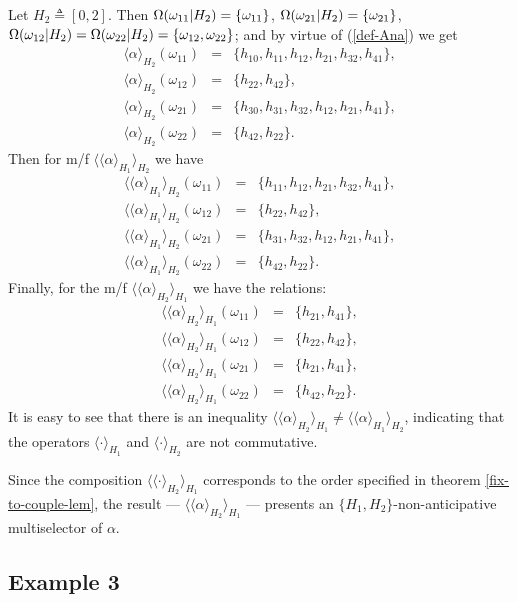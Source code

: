 \documentclass[sn-mathphys,Numbered,pdflatex]{sn-jnl}%
\theoremstyle{thmstyleone}%
\theoremstyle{thmstyletwo}%
\theoremstyle{thmstylethree}%
\newcommand{\mydef}{\mathrel{\triangleq}}%
\newcommand{\res}[2]{\ensuremath{(#1|#2)}}%
\newcommand{\naOm}{\ensuremath{\Omega}}%
\newcommand{\naOmo}[2]{\naOm\setbox0=\hbox{\text{$#1$}}\ifdim\wd0=0pt\else\res{#1}{#2}\fi}%
\newcommand{\Ana}[2]{\ensuremath{\langle{#1}\rangle_{#2}}}%
\newcommand{\fref}[1]{{\rm(\ref{#1})}}   %
\begin{document}
Let $H_2\mydef[0,2]$.
Then $\naOmo{\omega_{11}}{H_2}=\{\omega_{11}\}$, $\naOmo{\omega_{21}}{H_2}=\{\omega_{21}\}$, $\naOmo{\omega_{12}}{H_2}=\naOmo{\omega_{22}}{H_2}=\{\omega_{12},\omega_{22}\}$;
and by virtue of \fref{def-Ana} we get
\begin{eqnarray*}
  \Ana\alpha{H_2}(\omega_{11})&=&\{h_{10},h_{11},h_{12},h_{21},h_{32},h_{41}\} , \\
  \Ana\alpha{H_2}(\omega_{12})&=&\{h_{22},h_{42}\}, \\
  \Ana\alpha{H_2}(\omega_{21})&=&\{h_{30},h_{31},h_{32},h_{12},h_{21},h_{41}\} , \\
  \Ana\alpha{H_2}(\omega_{22})&=&\{h_{42},h_{22}\}.
\end{eqnarray*}
Then for m/f $\Ana{\Ana\alpha{H_1}}{H_2}$ we have
\begin{eqnarray*}
  \Ana{\Ana\alpha{H_1}}{H_2}(\omega_{11})&=&\{h_{11},h_{12},h_{21},h_{32},h_{41} \}, \\
  \Ana{\Ana\alpha{H_1}}{H_2}(\omega_{12})&=&\{h_{22},h_{42}\}, \\
  \Ana{\Ana\alpha{H_1}}{H_2}(\omega_{21})&=&\{h_{31},h_{32},h_{12},h_{21},h_{41} \}, \\
  \Ana{\Ana\alpha{H_1}}{H_2}(\omega_{22})&=&\{h_{42},h_{22}\}.
\end{eqnarray*}
Finally, for the m/f $\Ana{\Ana\alpha{H_2}}{H_1}$ we have the relations:
\begin{eqnarray*}
  \Ana{\Ana\alpha{H_2}}{H_1}(\omega_{11})&=&\{h_{21},h_{41}\}, \\
  \Ana{\Ana\alpha{H_2}}{H_1}(\omega_{12})&=&\{h_{22},h_{42}\}, \\
  \Ana{\Ana\alpha{H_2}}{H_1}(\omega_{21})&=&\{h_{21},h_{41}\}, \\
  \Ana{\Ana\alpha{H_2}}{H_1}(\omega_{22})&=&\{h_{42},h_{22}\}.
\end{eqnarray*}
It is easy to see that there is an inequality $\Ana{\Ana\alpha{H_2}}{H_1}\neq\Ana{\Ana\alpha{H_1}}{H_2}$, indicating that the operators $\Ana{\cdot}{H_1}$ and $\Ana{\cdot}{H_2}$ are not commutative.

Since the composition $\Ana{\Ana\cdot{H_2}}{H_1}$ corresponds to the order specified in theorem \ref{fix-to-couple-lem}, the result --- $\Ana{\Ana\alpha{H_2}}{H_1}$ --- presents an $\{H_1,H_2\}$-non-anticipative multiselector of $\alpha$.

\subsection{Example 3}
\label{ex3}
\end{document}

